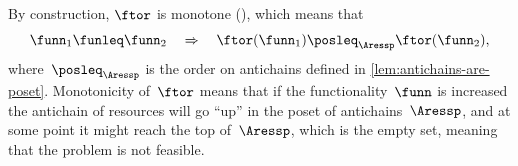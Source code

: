 By construction, $\ftor$ is monotone (), which
means that
\[
    \funn_{1}\funleq\funn_{2}\quad\Rightarrow\quad\ftor(\funn_{1})\posleq_{\Aressp}\ftor(\funn_{2}),
\]
where~$\posleq_{\Aressp}$ is the order on antichains defined in
\cref{lem:antichains-are-poset}. Monotonicity of~$\ftor$ means that
if the functionality~$\funn$ is increased the antichain of resources
will go ``up'' in the poset of antichains~$\Aressp$, and at some
point it might reach the top of~$\Aressp$, which is the empty set,
meaning that the problem is not feasible.




